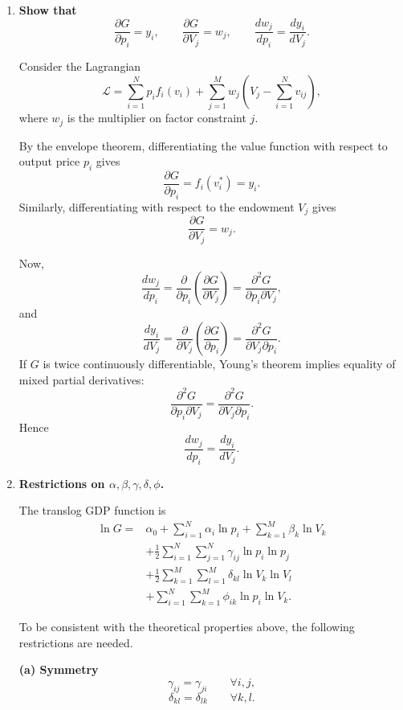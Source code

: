 \begin{enumerate}
\bigskip

\item[(iii)] \textbf{Show that}
\[
\frac{\partial G}{\partial p_i}=y_i,
\qquad
\frac{\partial G}{\partial V_j}=w_j,
\qquad
\frac{d w_j}{d p_i}=\frac{d y_i}{d V_j}.
\]

Consider the Lagrangian
\[
\mathcal{L}
=
\sum_{i=1}^N p_i f_i(v_i)
+
\sum_{j=1}^M w_j
\left(
V_j-\sum_{i=1}^N v_{ij}
\right),
\]
where $w_j$ is the multiplier on factor constraint $j$.

By the envelope theorem, differentiating the value function with respect to output price $p_i$ gives
\[
\frac{\partial G}{\partial p_i}
=
f_i(v_i^*)
=
y_i.
\]
Similarly, differentiating with respect to the endowment $V_j$ gives
\[
\frac{\partial G}{\partial V_j}
=
w_j.
\]

Now,
\[
\frac{d w_j}{d p_i}
=
\frac{\partial}{\partial p_i}\left(\frac{\partial G}{\partial V_j}\right)
=
\frac{\partial^2 G}{\partial p_i \partial V_j},
\]
and
\[
\frac{d y_i}{d V_j}
=
\frac{\partial}{\partial V_j}\left(\frac{\partial G}{\partial p_i}\right)
=
\frac{\partial^2 G}{\partial V_j \partial p_i}.
\]
If $G$ is twice continuously differentiable, Young's theorem implies equality of mixed partial derivatives:
\[
\frac{\partial^2 G}{\partial p_i \partial V_j}
=
\frac{\partial^2 G}{\partial V_j \partial p_i}.
\]
Hence
\[
\frac{d w_j}{d p_i}=\frac{d y_i}{d V_j}.
\]

\bigskip

\item[(iv)] \textbf{Restrictions on $\alpha,\beta,\gamma,\delta,\phi$.}

The translog GDP function is
\[
\begin{aligned}
\ln G
=
&\alpha_0
+ \sum_{i=1}^N \alpha_i \ln p_i
+ \sum_{k=1}^M \beta_k \ln V_k \\
&
+ \frac12 \sum_{i=1}^N \sum_{j=1}^N \gamma_{ij}\ln p_i \ln p_j\\
&+ \frac12 \sum_{k=1}^M \sum_{l=1}^M \delta_{kl}\ln V_k \ln V_l\\
&+ \sum_{i=1}^N \sum_{k=1}^M \phi_{ik}\ln p_i \ln V_k.
\end{aligned}
\]

To be consistent with the theoretical properties above, the following restrictions are needed.

\medskip

\textbf{(a) Symmetry}
\[
\gamma_{ij}=\gamma_{ji}
\qquad
\forall i,j,
\]
\[
\delta_{kl}=\delta_{lk}
\qquad
\forall k,l.
\]

\medskip


\end{enumerate}
